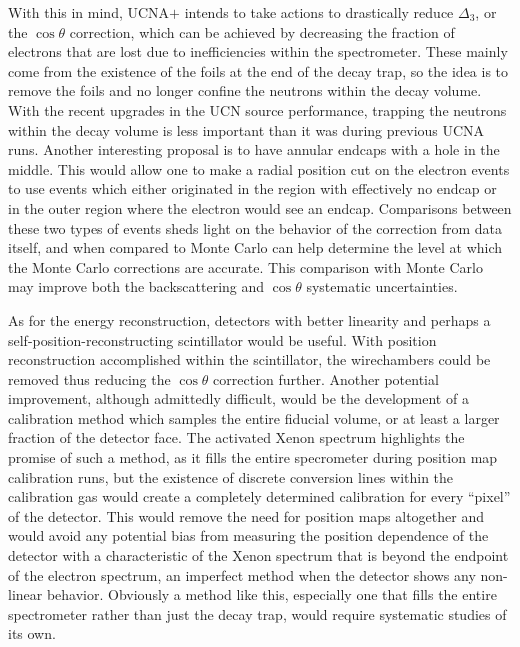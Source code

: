 With this in mind, UCNA$+$ intends to take actions to drastically reduce
$\Delta_3$, or the $\cos\theta$ correction, which can be achieved by decreasing the fraction
of electrons that are lost due to inefficiencies within the spectrometer. These mainly come from
the existence of the foils at the end of the decay trap, so the idea is to remove the foils and no longer
confine the neutrons within the decay volume. With
the recent upgrades in the UCN source performance, trapping the neutrons within the decay volume is
less important than it was during previous UCNA runs. Another interesting proposal is to have annular
endcaps with a hole in the middle. This would allow one to make a radial position cut on the electron
events to use events which either originated in the region with effectively no endcap or in the outer
region where the electron would see an endcap. Comparisons between these two types of events sheds
light on the behavior of the correction from data itself, and when compared to Monte Carlo can help
determine the level at which the Monte Carlo corrections are accurate. This comparison with Monte Carlo
may improve both the backscattering and $\cos\theta$ systematic uncertainties.

As for the energy reconstruction, detectors with better linearity and perhaps a
self-position-reconstructing scintillator would be useful. With position reconstruction accomplished
within the scintillator, the wirechambers could be removed thus reducing the $\cos\theta$ correction
further. Another potential improvement, although admittedly difficult,
would be the development of a calibration method
which samples the entire fiducial volume, or at least a larger fraction of the detector face. The activated
Xenon spectrum highlights the promise of such a method, as it fills the entire specrometer during position
map calibration runs, but the existence of discrete conversion lines within the calibration gas would create
a completely determined calibration for every ``pixel'' of the detector. This would remove the need for position
maps altogether and would avoid any
potential bias from measuring the position dependence of the detector with a characteristic of the Xenon
spectrum that is beyond the endpoint of the electron spectrum, an imperfect method when the detector
shows any non-linear behavior. Obviously a method like this, especially one that fills the entire
spectrometer rather than just the decay trap, would require systematic studies of its own.

